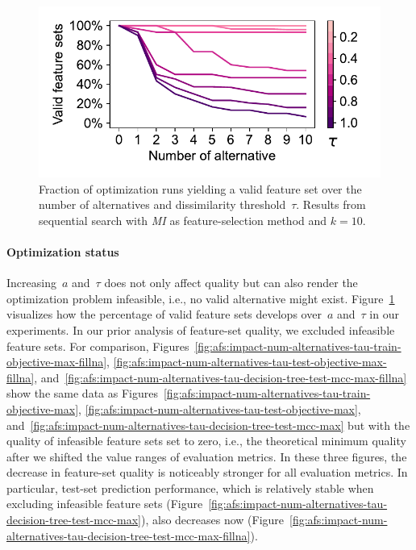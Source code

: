 \documentclass[iicol, sn-basic, Numbered]{sn-jnl} %
\theoremstyle{plain}
\theoremstyle{definition}
\begin{document}
\begin{figure}[t]
	\centering
	\includegraphics[width=\columnwidth, trim=15 15 20 10, clip]{plots/afs-impact-num-alternatives-tau-optimization-status.pdf}
	\caption{
		Fraction of optimization runs yielding a valid feature set over the number of alternatives and dissimilarity threshold~$\tau$.
		Results from sequential search with \emph{MI} as feature-selection method and $k=10$.
	}
	\label{fig:afs:impact-num-alternatives-tau-optimization-status}
\end{figure}

\paragraph{Optimization status}

Increasing~$a$ and~$\tau$ does not only affect quality but can also render the optimization problem infeasible, i.e., no valid alternative might exist.
Figure~\ref{fig:afs:impact-num-alternatives-tau-optimization-status} visualizes how the percentage of valid feature sets develops over~$a$ and~$\tau$ in our experiments.
In our prior analysis of feature-set quality, we excluded infeasible feature sets.
For comparison, Figures~\ref{fig:afs:impact-num-alternatives-tau-train-objective-max-fillna}, \ref{fig:afs:impact-num-alternatives-tau-test-objective-max-fillna}, and~\ref{fig:afs:impact-num-alternatives-tau-decision-tree-test-mcc-max-fillna} show the same data as Figures~\ref{fig:afs:impact-num-alternatives-tau-train-objective-max}, \ref{fig:afs:impact-num-alternatives-tau-test-objective-max}, and~\ref{fig:afs:impact-num-alternatives-tau-decision-tree-test-mcc-max} but with the quality of infeasible feature sets set to zero, i.e., the theoretical minimum quality after we shifted the value ranges of evaluation metrics.
In these three figures, the decrease in feature-set quality is noticeably stronger for all evaluation metrics.
In particular, test-set prediction performance, which is relatively stable when excluding infeasible feature sets (Figure~\ref{fig:afs:impact-num-alternatives-tau-decision-tree-test-mcc-max}), also decreases now (Figure~\ref{fig:afs:impact-num-alternatives-tau-decision-tree-test-mcc-max-fillna}).
\end{document}
